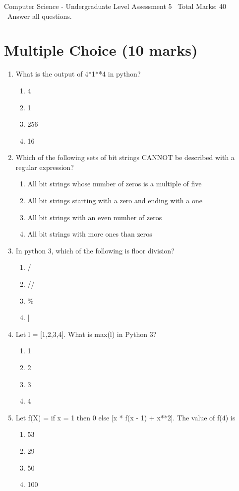 \documentclass[12pt]{article}
\begin{document}
\begin{center}
Computer Science - Undergraduate Level Assessment 5 \
Total Marks: 40 \
Answer all questions.
\end{center}

\section*{Multiple Choice (10 marks)}
\begin{enumerate}[label=\arabic*.]
\item What is the output of 4*1**4 in python?
\begin{enumerate}[label=(\alph*)]
    \item 4
    \item 1
    \item 256
    \item 16
\end{enumerate}
\item Which of the following sets of bit strings CANNOT be described with a regular expression?
\begin{enumerate}[label=(\alph*)]
    \item All bit strings whose number of zeros is a multiple of five
    \item All bit strings starting with a zero and ending with a one
    \item All bit strings with an even number of zeros
    \item All bit strings with more ones than zeros
\end{enumerate}
\item In python 3, which of the following is floor division?
\begin{enumerate}[label=(\alph*)]
    \item /
    \item //
    \item \%
    \item |
\end{enumerate}
\item Let l = [1,2,3,4]. What is max(l) in Python 3?
\begin{enumerate}[label=(\alph*)]
    \item 1
    \item 2
    \item 3
    \item 4
\end{enumerate}
\item Let f(X) = if x = 1 then 0 else [x * f(x - 1) + x**2]. The value of f(4) is
\begin{enumerate}[label=(\alph*)]
    \item 53
    \item 29
    \item 50
    \item 100
\end{enumerate}
\end{enumerate}
\end{document}
